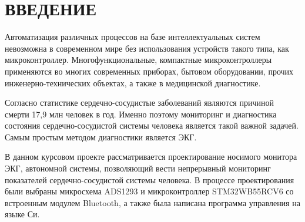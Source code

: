 \begin{sloppypar} %
\newpage %
\section*{ВВЕДЕНИЕ} %
Автоматизация различных процессов на базе интеллектуальных систем невозможна в современном мире без использования устройств такого типа, как микроконтроллер. Многофункциональные, компактные микроконтроллеры применяются во многих современных приборах, бытовом оборудовании, прочих инженерно-технических объектах, а также в медицинской диагностике.

Согласно статистике сердечно-сосудистые заболеваний являются причиной смерти 17,9 млн человек в год. Именно поэтому мониторинг и диагностика состояния сердечно-сосудистой системы человека является такой важной задачей. Самым простым методом диагностики является ЭКГ.

В данном курсовом проекте рассматривается проектирование носимого монитора ЭКГ, автономной системы, позволяющий вести непрерывный мониторинг показателей сердечно-сосудистой системы человека. В процессе проектирования были выбраны микросхема ADS1293 и микроконтроллер STM32WB55RCV6 со встроенным модулем Bluetooth, а также была написана программа управления на языке Си.

\end{sloppypar}
